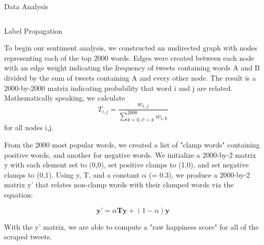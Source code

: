 \documentclass[final]{beamer}
\newlength{\onecolwid}
\newlength{\twocolwid}
\begin{document}
\begin{frame}[t]
\begin{columns}[t]
\begin{column}{\twocolwid}

\begin{block}{Data Analysis}
\end{block} 

\begin{columns}[t,totalwidth=\twocolwid] %

\begin{column}{\onecolwid}\vspace{-.6in} %


\begin{block}{Label Propagation}

To begin our sentiment analysis, we constructed an undirected graph with nodes representing each of the top 2000 words. Edges were created between each node with an edge weight indicating the frequency of tweets containing words A and B divided by the sum of tweets containing A and every other node. The result is a 2000-by-2000 matrix indicating probability that word i and j are related. Mathematically speaking, 
we calculate 
\begin{equation}
T_{i,j} = \frac{w_{i,j}}{\sum_{k=0, i!=k}^{2000} w_{i,k}}
\end{equation}
for all nodes i,j. 

From the 2000 most popular words, we created a list of "clamp words" containing positive words, and another for negative words.  We initialize a 2000-by-2 matrix y with each element set to (0,0), set positive clamps to (1,0), and set negative clamps to (0,1). Using y, T, and a constant $\alpha$ (= 0.3), we produce a 2000-by-2 matrix y' that relates non-clamp words with their clamped words via the equation:

\begin{equation}
\textbf{y'} = \alpha \textbf{Ty} + (1-\alpha)\textbf{y}
\end{equation}

With the y' matrix, we are able to compute a "raw happiness score" for all of the scraped tweets.


\end{block}
\end{column}
\end{columns}
\end{column}
\end{columns}
\end{frame}
\end{document}
